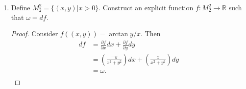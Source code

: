 \documentclass{article}
\begin{document}
\begin{enumerate}[label={\bf Q\arabic*:}]
\begin{enumerate}
      \item Define $M^2_2=\{(x,y)|x>0\}$. Construct an explicit function
        $f:M^2_2\rightarrow\mathbb{R}$ such that $\omega=df$.
        \begin{proof}
          Consider $f((x,y))=\arctan{y/x}$. Then
          \begin{align*}
            df &=\frac{\partial f}{\partial x}dx + \frac{\partial
              f}{\partial y}dy \\
              &=\left(\frac{-y}{x^2+y^2}\right)dx
                +\left(\frac{x}{x^2+y^2}\right)dy \\
              &=\omega. \\
          \end{align*}
        \end{proof}
    \end{enumerate}
\end{enumerate}
\end{document}
